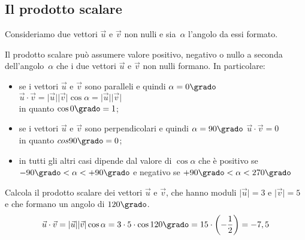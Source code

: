 \subsection{Il prodotto scalare}
\begin{minipage}{.59 \textwidth}
Consideriamo due vettori $\vec{u}$ e $\vec{v}$ 
non nulli e sia~$\alpha$ l'angolo da essi formato.
\end{minipage}
\hfill
\begin{minipage}{.59 \textwidth}
\begin{inaccessibleblock}
 \begin{center}
  
 \end{center}
\end{inaccessibleblock}
\end{minipage}

Il prodotto scalare può assumere valore positivo, negativo o nullo a seconda 
dell'angolo~$\alpha$ che i due vettori $\vec{u}$ e $\vec{v}$ non nulli formano. 
In particolare:
\begin{itemize} [noitemsep]
 \item se i vettori $\vec{u}$ e $\vec{v}$ sono paralleli e 
  quindi $\alpha=0\grado$
  \(\vec{u} \cdot \vec{v} = 
    \lvert\vec{u}\rvert\lvert\vec{v}\rvert \cos \alpha = 
    \lvert\vec{u}\rvert\lvert\vec{v}\rvert\) \\
  in quanto $\cos 0\grado = 1$;
 \item se i vettori $\vec{u}$ e $\vec{v}$ sono perpendicolari e 
  quindi $\alpha=90\grado$
  \(\vec{u} \cdot \vec{v} = 0\) \\ 
  in quanto $cos 90\grado = 0$;
 \item in tutti gli altri casi dipende dal valore di $\cos \alpha$ che è 
  positivo se $-90\grado < \alpha < +90\grado$ e negativo 
  se $+90\grado < \alpha < 270\grado$
\end{itemize}

 \begin{esempio}
  Calcola il prodotto scalare dei  vettori $\vec{u}$ e $\vec{v}$, 
  che hanno moduli $\lvert\vec{u}\rvert= 3 \text{ e } \lvert\vec{v}\rvert=5$ 
  e che formano un angolo di $120\grado$.
  \[\vec{u} \cdot \vec{v} = 
    \lvert\vec{u}\rvert\lvert\vec{v}\rvert \cos \alpha=
    3 \cdot 5 \cdot \cos 120\grado = 15 \cdot \left(-\frac{1}{2} \right)=
    -7,5\]
 \end{esempio}

